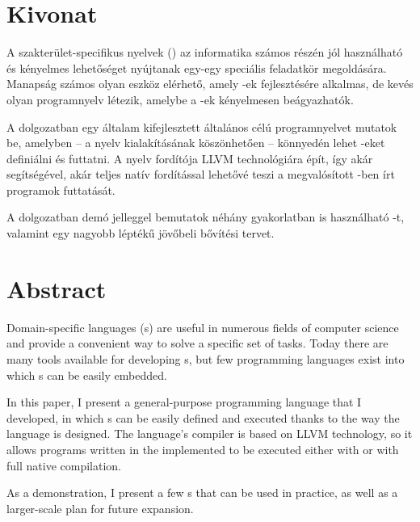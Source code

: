 \setcounter{page}{1}

\selecthungarian

\chapter*{Kivonat}

A szakterület-specifikus nyelvek () az informatika számos részén jól használható és kényelmes lehetőséget nyújtanak egy-egy speciális feladatkör megoldására.
Manapság számos olyan eszköz elérhető, amely -ek fejlesztésére alkalmas, de kevés olyan programnyelv létezik, amelybe a -ek kényelmesen beágyazhatók.

A dolgozatban egy általam kifejlesztett általános célú programnyelvet mutatok be, amelyben -- a nyelv kialakításának köszönhetően -- könnyedén lehet -eket definiálni és futtatni.
A nyelv fordítója LLVM technológiára épít, így akár  segítségével, akár teljes natív fordítással lehetővé teszi a megvalósított -ben írt programok futtatását.

A dolgozatban demó jelleggel bemutatok néhány gyakorlatban is használható -t, valamint egy nagyobb léptékű jövőbeli bővítési tervet.

\vfill
\selectenglish


\chapter*{Abstract}

Domain-specific languages (s) are useful in numerous fields of computer science and provide a convenient way to solve a specific set of tasks.
Today there are many tools available for developing s, but few programming languages exist into which s can be easily embedded.

In this paper, I present a general-purpose programming language that I developed, in which s can be easily defined and executed thanks to the way the language is designed.
The language's compiler is based on LLVM technology, so it allows programs written in the implemented  to be executed either with  or with full native compilation.

As a demonstration, I present a few s that can be used in practice, as well as a larger-scale plan for future expansion.

\vfill
\selectthesislanguage

\setcounter{romanPage}{\value{page}}
